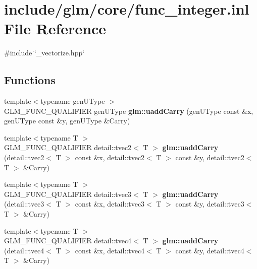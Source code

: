 \hypertarget{func__integer_8inl}{\section{include/glm/core/func\-\_\-integer.inl \-File \-Reference}
\label{func__integer_8inl}
}
{\ttfamily \#include \char`\"{}\-\_\-vectorize.\-hpp\char`\"{}}\*
\subsection*{\-Functions}
\begin{DoxyCompactItemize}
\item 
\hypertarget{namespaceglm_aa6e437f5a00dcedce2890eb468908b59}{{\footnotesize template$<$typename gen\-U\-Type $>$ }\\\-G\-L\-M\-\_\-\-F\-U\-N\-C\-\_\-\-Q\-U\-A\-L\-I\-F\-I\-E\-R gen\-U\-Type {\bfseries glm\-::uadd\-Carry} (gen\-U\-Type const \&x, gen\-U\-Type const \&y, gen\-U\-Type \&\-Carry)}\label{namespaceglm_aa6e437f5a00dcedce2890eb468908b59}

\item 
\hypertarget{namespaceglm_a87a1c2105448723bbd560ea9157da7f7}{{\footnotesize template$<$typename T $>$ }\\\-G\-L\-M\-\_\-\-F\-U\-N\-C\-\_\-\-Q\-U\-A\-L\-I\-F\-I\-E\-R \*
detail\-::tvec2$<$ \-T $>$ {\bfseries glm\-::uadd\-Carry} (detail\-::tvec2$<$ \-T $>$ const \&x, detail\-::tvec2$<$ \-T $>$ const \&y, detail\-::tvec2$<$ \-T $>$ \&\-Carry)}\label{namespaceglm_a87a1c2105448723bbd560ea9157da7f7}

\item 
\hypertarget{namespaceglm_a7b00aba4f9826a78a4bcdd7a9aef5b7f}{{\footnotesize template$<$typename T $>$ }\\\-G\-L\-M\-\_\-\-F\-U\-N\-C\-\_\-\-Q\-U\-A\-L\-I\-F\-I\-E\-R \*
detail\-::tvec3$<$ \-T $>$ {\bfseries glm\-::uadd\-Carry} (detail\-::tvec3$<$ \-T $>$ const \&x, detail\-::tvec3$<$ \-T $>$ const \&y, detail\-::tvec3$<$ \-T $>$ \&\-Carry)}\label{namespaceglm_a7b00aba4f9826a78a4bcdd7a9aef5b7f}

\item 
\hypertarget{namespaceglm_a23d2f491392fa08223abc23ec758d2d5}{{\footnotesize template$<$typename T $>$ }\\\-G\-L\-M\-\_\-\-F\-U\-N\-C\-\_\-\-Q\-U\-A\-L\-I\-F\-I\-E\-R \*
detail\-::tvec4$<$ \-T $>$ {\bfseries glm\-::uadd\-Carry} (detail\-::tvec4$<$ \-T $>$ const \&x, detail\-::tvec4$<$ \-T $>$ const \&y, detail\-::tvec4$<$ \-T $>$ \&\-Carry)}\label{namespaceglm_a23d2f491392fa08223abc23ec758d2d5}


\end{DoxyCompactItemize}
